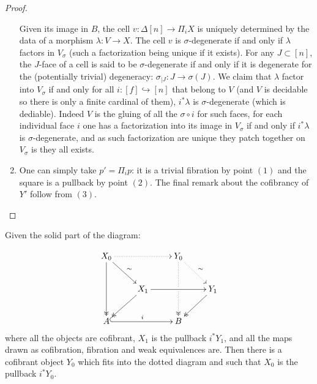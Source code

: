 \documentclass[reqno,10pt,a4paper,oneside,draft]{amsart}
\begin{document}
\begin{proof}
\begin{enumerate}[$(i)$]
Given its image in $B$, the cell $v: \Delta[n] \rightarrow \Pi_i X$ is uniquely determined by the data of a morphism $\lambda: V\rightarrow X$. The cell $v$ is $\sigma$-degenerate if and only if $\lambda$ factors in $V_{\sigma}$ (such a factorization being unique if it exists). For any $J \subset [n]$, the $J$-face of a cell is said to be $\sigma$-degenerate if and only if it is degenerate for the (potentially trivial) degeneracy: $\sigma_{|J} : J \rightarrow \sigma(J)$. We claim that $\lambda$ factor into $V_{\sigma}$ if and only for all $i:[f] \hookrightarrow [n]$ that belong to $V$ (and $V$ is decidable so there is only a finite cardinal of them), $i^* \lambda$ is $\sigma$-degenerate (which is dediable). Indeed $V$ is the gluing of all the $\sigma \circ i$ for such faces, for each individual face $i$ one has a factorization into its image in $V_{\sigma}$ if and only if $i^* \lambda$ is $\sigma$-degenerate, and as such factorization are unique they patch together on $V_{\sigma}$ is they all exists.

\item One can simply take $p'= \Pi_i p$: it is a trivial fibration by point $(1)$ and the square is a pullback by point $(2)$. The final remark about the cofibrancy of $Y'$ follow from $(3)$.

\end{enumerate}
\end{proof}



\begin{proposition}
\label{Prop:Homotopy_ext_prop}
Given the solid part of the diagram:

\[ 
\xymatrix{
  X_0
  \ar@{.>}[rr]
  \ar[dr]^{\sim}
  \ar@{->>}[dd]
&&
  Y_0
  \ar@{.>}[dr]^{\sim}
  \ar@{.>>}[dd]|{\hole}
&\\&
  X_1
  \ar[rr]
  \ar@{->>}[dl]
&&
  Y_1
  \ar@{->>}[dl]
\\
  A
  \ar@{^{(}->}[rr]^i
&&
  B
&
}
\]
where all the objects are cofibrant, $X_1$ is the pullback $i^* Y_1$, and all the maps drawn as cofibration, fibration and weak equivalences are. Then there is a cofibrant object $Y_0$ which fits into the dotted diagram and such that $X_0$ is the pullback $i^* Y_0$.



\end{proposition}
\end{document}
